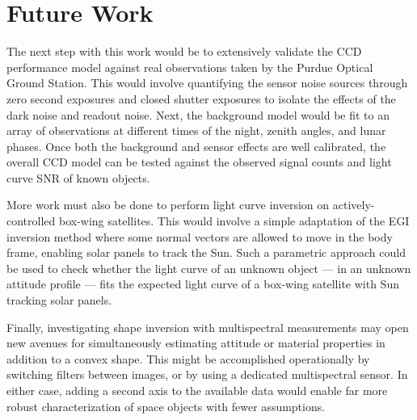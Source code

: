 
\chapter{Future Work}

The next step with this work would be to extensively validate the CCD performance model against real observations taken by the Purdue Optical Ground Station. This would involve quantifying the sensor noise sources through zero second exposures and closed shutter exposures to isolate the effects of the dark noise and readout noise. Next, the background model would be fit to an array of observations at different times of the night, zenith angles, and lunar phases. Once both the background and sensor effects are well calibrated, the overall CCD model can be tested against the observed signal counts and light curve SNR of known objects.

More work must also be done to perform light curve inversion on actively-controlled box-wing satellites. This would involve a simple adaptation of the EGI inversion method where some normal vectors are allowed to move in the body frame, enabling solar panels to track the Sun. Such a parametric approach could be used to check whether the light curve of an unknown object --- in an unknown attitude profile --- fits the expected light curve of a box-wing satellite with Sun tracking solar panels. 

Finally, investigating shape inversion with multispectral measurements may open new avenues for simultaneously estimating attitude or material properties in addition to a convex shape. This might be accomplished operationally by switching filters between images, or by using a dedicated multispectral sensor. In either case, adding a second axis to the available data would enable far more robust characterization of space objects with fewer assumptions.